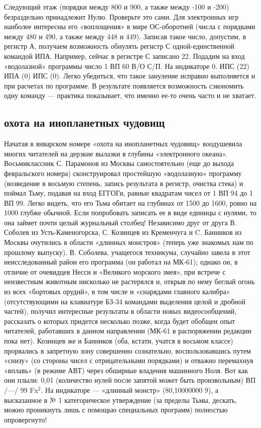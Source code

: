 \documentclass[11pt,a4paper,oneside]{article}
\begin{document}
Следующий этаж (порядки между 800 и 900, а также между -100 и -200) безраздельно принадлежит Нулю. Проверьте это сами. Для электронных игр наиболее интересны его «воплощения» в мире ОС-оборотней (числа с порядками между 480 и 490, а также между 448 и 449). Записав такое число, допустим, в регистр А, получаем возможность обнулять регистр С одной-единственной командой ИПА. Например, сейчас в регистре С записано 22. Подадим на вход «водолазной» программы число 1 ВП 60 В/О С/П. На индикаторе 0. ИПС (22) ИПА (0) ИПС (0). Легко убедиться, что такое зануление исправно выполняется и при расчетах по программе. В результате появляется возможность сэкономить одну команду — практика показывает, что именно ее-то очень часто и не хватает.

\subsection{охота на инопланетных чудовищ}
Начатая в январском номере «охота на инопланетных чудовищ» воодушевила многих читателей на дерзкие вылазки в глубины «электронного океана». Восьмиклассник С. Парамонов из Москвы самостоятельно (еще до выхода февральского номера) сконструировал простейшую «водолазную» программу (возведение в восьмую степень, запись результата в регистр, очистка стека) и поймал Тьму, подавая на вход ЕГГОГи, равные квадратам чисел от 1 ВП 94 до 1 ВП 99. Легко видеть, что его Тьма обитает на глубинах от 1500 до 1600, ровно на 1000 глубже обычной. Если попробовать записать ее в виде единицы с нулями, то она займет почти целый журнальный столбец! Независимо друг от друга В. Соболев из Усть-Каменогорска, С. Козинцев из Кременчуга и C. 	Банников из Москвы очутились в области «длинных монстров» (теперь уже знакомых нам по прошлому выпуску). В. Соболева, учащегося техникума, случайно завела в этот неисследованный район его программа (он работал на МК-61); однако он, в отличие от очевидцев Несси и «Великого морского змея», при встрече с неизвестным животным нисколько не растерялся и, открыв по нему беглый огонь из всех «бортовых орудий», в том числе и «снарядами главного калибра» (отсутствующими на клавиатуре БЗ-34 командами выделения целой и дробной частей), получил интересные результаты в области новых видеосообщений, рассказать о которых придется несколько позже, когда будет обобщен опыт читателей, работавших в данном направлении (МК-61 в распоряжении редакции пока нет). Козинцев же и Банников (оба, кстати, учатся в восьмом классе) прорвались в запретную зону совершенно сознательно, воспользовавшись путем «снизу» (со стороны чисел с отрицательными порядками) и отважно перемахнув «вплавь» (в режиме АВТ) через обширные владения машинного Ноля. Вот как они плыли: 0,01 (количество нулей после запятой может быть произвольным) ВП /—/ 99 Fx$^{2}$. На индикаторе — «длинный монстр» (80,10000000 9), а высказанное в № 1 категорическое утверждение (за пределы Тьмы, дескать, можно проникнуть лишь с помощью специальных программ) полностью опровергнуто!
\end{document}
